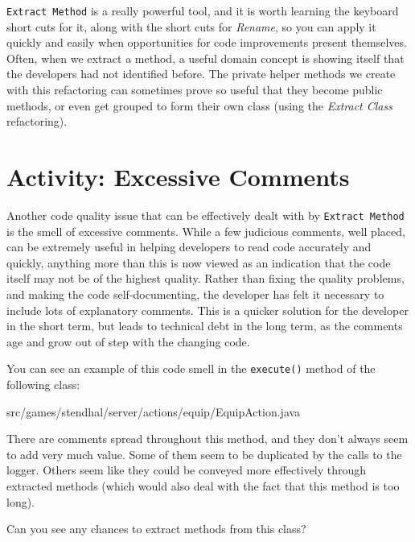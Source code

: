 \documentclass[
]{book}
\newenvironment{Shaded}{\begin{snugshade}}{\end{snugshade}}
\newcommand{\FunctionTok}[1]{\textcolor[rgb]{0.00,0.00,0.00}{#1}}
\newcommand{\NormalTok}[1]{#1}
\begin{document}
\texttt{Extract\ Method} is a really powerful tool, and it is worth learning the keyboard short cuts for it, along with the short cuts for \emph{Rename}, so you can apply it quickly and easily when opportunities for code improvements present themselves. Often, when we extract a method, a useful domain concept is showing itself that the developers had not identified before. The private helper methods we create with this refactoring can sometimes prove so useful that they become public methods, or even get grouped to form their own class (using the \emph{Extract Class} refactoring).

\hypertarget{excessive}{%
\section{Activity: Excessive Comments}\label{excessive}}

Another code quality issue that can be effectively dealt with by \texttt{Extract\ Method} is the smell of excessive comments. While a few judicious comments, well placed, can be extremely useful in helping developers to read code accurately and quickly, anything more than this is now viewed as an indication that the code itself may not be of the highest quality. Rather than fixing the quality problems, and making the code self-documenting, the developer has felt it necessary to include lots of explanatory comments. This is a quicker solution for the developer in the short term, but leads to technical debt in the long term, as the comments age and grow out of step with the changing code.

You can see an example of this code smell in the \texttt{execute()} method of the following class:

\begin{Shaded}
\begin{Highlighting}[]
\NormalTok{src/games/stendhal/server/actions/equip/EquipAction.}\FunctionTok{java}
\end{Highlighting}
\end{Shaded}

There are comments spread throughout this method, and they don't always seem to add very much value. Some of them seem to be duplicated by the calls to the logger. Others seem like they could be conveyed more effectively through extracted methods (which would also deal with the fact that this method is too long).

Can you see any chances to extract methods from this class?
\end{document}
